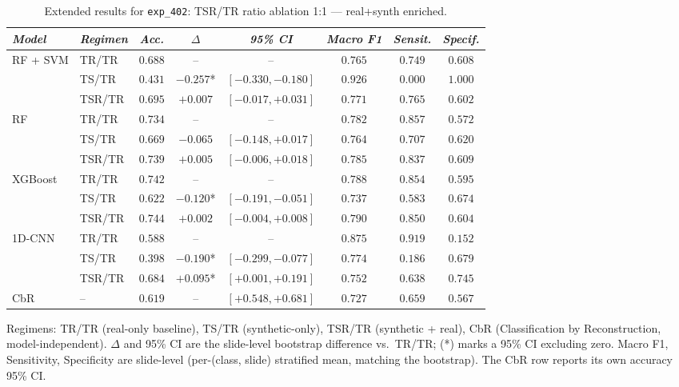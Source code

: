 \begin{table}[htp]
\centering
\scriptsize
\caption{Extended results for \texttt{exp\_402}: TSR/TR ratio ablation 1:1 — real+synth enriched.}
\label{tab:appendix_exp_402}
\begin{tabular*}{\textwidth}{@{\extracolsep{\fill}}llcccccc}
\toprule
\emph{Model} & \emph{Regimen} & \emph{Acc.} & \emph{$\Delta$} & \emph{95\% CI} & \emph{Macro F1} & \emph{Sensit.} & \emph{Specif.}\\
\midrule
\multirow{3}{*}{RF + SVM} & TR/TR & $0.688$ & -- & -- & $0.765$ & $0.749$ & $0.608$\\
 & TS/TR & $0.431$ & $-0.257$* & $[-0.330, -0.180]$ & $0.926$ & $0.000$ & $1.000$\\
 & TSR/TR & $0.695$ & $+0.007$ & $[-0.017, +0.031]$ & $0.771$ & $0.765$ & $0.602$\\
\midrule
\multirow{3}{*}{RF} & TR/TR & $0.734$ & -- & -- & $0.782$ & $0.857$ & $0.572$\\
 & TS/TR & $0.669$ & $-0.065$ & $[-0.148, +0.017]$ & $0.764$ & $0.707$ & $0.620$\\
 & TSR/TR & $0.739$ & $+0.005$ & $[-0.006, +0.018]$ & $0.785$ & $0.837$ & $0.609$\\
\midrule
\multirow{3}{*}{XGBoost} & TR/TR & $0.742$ & -- & -- & $0.788$ & $0.854$ & $0.595$\\
 & TS/TR & $0.622$ & $-0.120$* & $[-0.191, -0.051]$ & $0.737$ & $0.583$ & $0.674$\\
 & TSR/TR & $0.744$ & $+0.002$ & $[-0.004, +0.008]$ & $0.790$ & $0.850$ & $0.604$\\
\midrule
\multirow{3}{*}{1D-CNN} & TR/TR & $0.588$ & -- & -- & $0.875$ & $0.919$ & $0.152$\\
 & TS/TR & $0.398$ & $-0.190$* & $[-0.299, -0.077]$ & $0.774$ & $0.186$ & $0.679$\\
 & TSR/TR & $0.684$ & $+0.095$* & $[+0.001, +0.191]$ & $0.752$ & $0.638$ & $0.745$\\
\midrule
CbR & -- & $0.619$ & -- & $[+0.548, +0.681]$ & $0.727$ & $0.659$ & $0.567$\\
\bottomrule
\end{tabular*}
\small{Regimens: TR/TR (real-only baseline), TS/TR (synthetic-only), TSR/TR (synthetic + real), CbR (Classification by Reconstruction, model-independent). $\Delta$ and 95\% CI are the slide-level bootstrap difference vs.\ TR/TR; (*) marks a 95\% CI excluding zero. Macro F1, Sensitivity, Specificity are slide-level (per-(class, slide) stratified mean, matching the bootstrap). The CbR row reports its own accuracy 95\% CI.}
\end{table}

